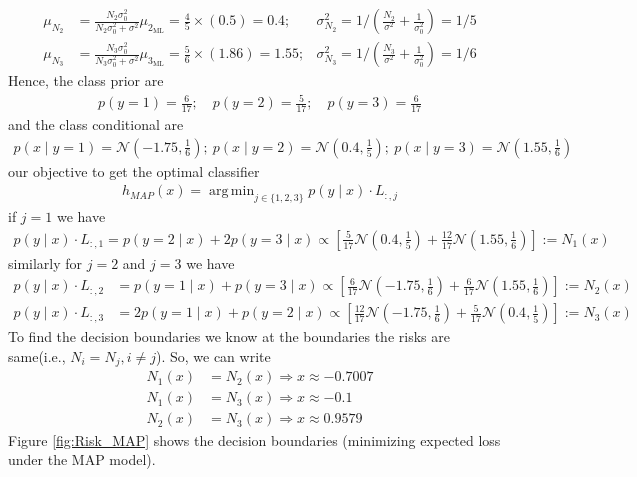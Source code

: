 \documentclass[solution,addpoints,12pt]{exam}
\DeclareMathOperator*{\argmin}{arg\,min}
\begin{document}
\begin{questions}
\begin{parts}
\begin{subparts}
\begin{solution}
\begin{align*}
		\mu_{N_2}&=\frac{N_2\sigma_{0}^2}{N_2\sigma_{0}^2+\sigma^2}\mu_{2_{\text{ML}}}=\frac{4}{5}\times (0.5)=0.4;&\sigma_{N_2}^2 = 1/\left(\frac{N_2}{\sigma^2}+\frac{1}{\sigma_{0}^2}\right)=1/5\\
		\mu_{N_3}&=\frac{N_3\sigma_{0}^2}{N_3\sigma_{0}^2+\sigma^2}\mu_{3_{\text{ML}}}=\frac{5}{6}\times (1.86)=1.55;&\sigma_{N_3}^2 = 1/\left(\frac{N_3}{\sigma^2}+\frac{1}{\sigma_{0}^2}\right)=1/6
	\end{align*}
	Hence, the class prior are 
	\begin{align*}
		p(y=1)=\frac{6}{17};\quad
		p(y=2)=\frac{5}{17};\quad
		p(y=3)=\frac{6}{17}	
	\end{align*}
	and the class conditional are
	\begin{align*}
		p(x\mid y=1)=\mathcal{N}\left(-1.75,\frac{1}{6}\right);~
		p(x\mid y=2)=\mathcal{N}\left(0.4,\frac{1}{5}\right);~
		p(x\mid y=3)=\mathcal{N}\left(1.55,\frac{1}{6}\right)
	\end{align*}
	our objective to get the optimal classifier
	\begin{align*}
		h_{MAP}(x) = \argmin_{j\in\{1,2,3\}} p(y\mid x)\cdot L_{:,j}
	\end{align*} 
	if $j=1$ we have
	\begin{align*}
		p(y\mid x)\cdot L_{:,1} =p(y=2\mid x)+2p(y=3\mid x)\propto\left[\frac{5}{17}\mathcal{N}\left(0.4,\frac{1}{5}\right)+\frac{12}{17}\mathcal{N}\left(1.55,\frac{1}{6}\right)\right]:=N_1(x)
	\end{align*}
	similarly for $j=2 $ and $j=3$ we have
	\begin{align*}
		p(y\mid x)\cdot L_{:,2}& =p(y=1\mid x)+p(y=3\mid x)\propto\left[\frac{6}{17}\mathcal{N}\left(-1.75,\frac{1}{6}\right)+\frac{6}{17}\mathcal{N}\left(1.55,\frac{1}{6}\right)\right]:=N_2(x)\\
		p(y\mid x)\cdot L_{:,3}& =2p(y=1\mid x)+p(y=2\mid x)\propto\left[\frac{12}{17}\mathcal{N}\left(-1.75,\frac{1}{6}\right)+\frac{5}{17}\mathcal{N}\left(0.4,\frac{1}{5}\right)\right]:=N_3(x)
	\end{align*}
	To find the decision boundaries we know at the boundaries the risks are same(i.e., $N_i=N_j,i\neq j $). So, we can write
	\begin{align*}
		N_1(x)&=N_2(x)\Rightarrow x\approx -0.7007\\
		N_1(x)&=N_3(x)\Rightarrow x\approx -0.1\\
		N_2(x)&=N_3(x)\Rightarrow x\approx 0.9579
	\end{align*}
	Figure \ref{fig:Risk_MAP} shows the decision boundaries (minimizing expected loss under the MAP model).

\end{solution}
\end{subparts}
\end{parts}
\end{questions}
\end{document}
